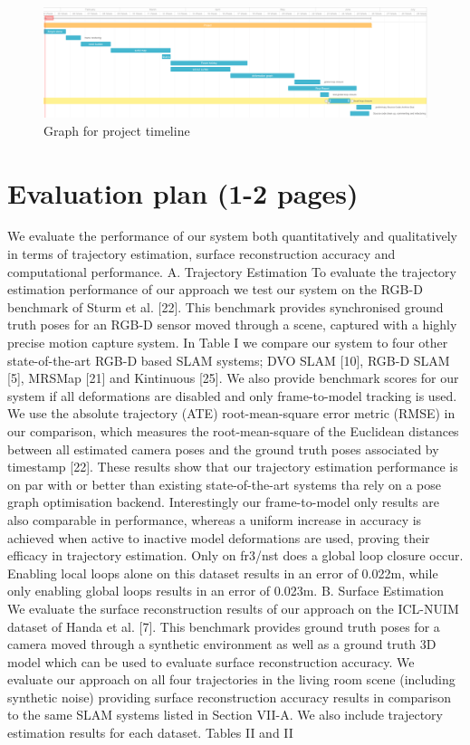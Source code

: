 \documentclass[12pt,twoside]{article}
\begin{document}
\newpage

\begin{figure}
\centering
    \includegraphics[angle=90,width=\textwidth,height=\textheight,keepaspectratio]{figures/timeline2}
   \caption{Graph for project timeline}
    \label{fig:tiemline2}
\end{figure}

\newpage

\section{Evaluation plan (1-2 pages)}

We evaluate the performance of our system both quantitatively
and qualitatively in terms of trajectory estimation, surface
reconstruction accuracy and computational performance.
A. Trajectory Estimation
To evaluate the trajectory estimation performance of our approach
we test our system on the RGB-D benchmark of Sturm
et al. [22]. This benchmark provides synchronised ground truth
poses for an RGB-D sensor moved through a scene, captured
with a highly precise motion capture system. In Table I we
compare our system to four other state-of-the-art RGB-D
based SLAM systems; DVO SLAM [10], RGB-D SLAM [5],
MRSMap [21] and Kintinuous [25]. We also provide benchmark
scores for our system if all deformations are disabled
and only frame-to-model tracking is used. We use the absolute
trajectory (ATE) root-mean-square error metric (RMSE) in
our comparison, which measures the root-mean-square of the
Euclidean distances between all estimated camera poses and
the ground truth poses associated by timestamp [22]. These
results show that our trajectory estimation performance is on
par with or better than existing state-of-the-art systems tha
rely on a pose graph optimisation backend. Interestingly our
frame-to-model only results are also comparable in performance,
whereas a uniform increase in accuracy is achieved
when active to inactive model deformations are used, proving
their efficacy in trajectory estimation. Only on fr3/nst does
a global loop closure occur. Enabling local loops alone on
this dataset results in an error of 0.022m, while only enabling
global loops results in an error of 0.023m.
B. Surface Estimation
We evaluate the surface reconstruction results of our approach
on the ICL-NUIM dataset of Handa et al. [7]. This
benchmark provides ground truth poses for a camera moved
through a synthetic environment as well as a ground truth 3D
model which can be used to evaluate surface reconstruction
accuracy. We evaluate our approach on all four trajectories in
the living room scene (including synthetic noise) providing
surface reconstruction accuracy results in comparison to the
same SLAM systems listed in Section VII-A. We also include
trajectory estimation results for each dataset. Tables II and II




\end{document}
